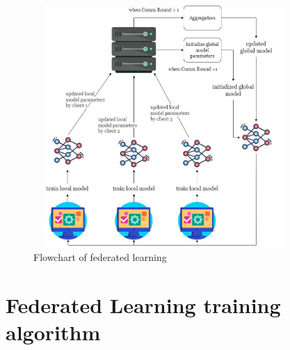 \begin{figure}[H]
\centering
\includegraphics[width=100mm,height=92mm]{figures/federatedround.jpg}
\caption{Flowchart of federated learning}
\label{Flowchart of federated learning}
\end{figure}

\section{Federated Learning training algorithm}
